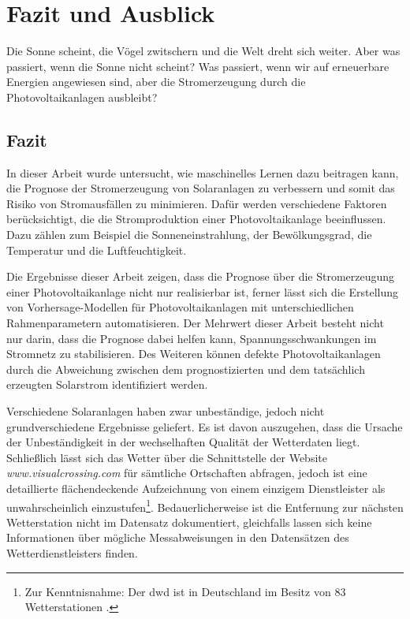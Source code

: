 \documentclass[12pt, a4paper]{article}
\begin{document}

\newpage

\section{Fazit und Ausblick}
\label{sec:conclusion_outlook}

Die Sonne scheint, die Vögel zwitschern und die Welt dreht sich weiter. Aber was passiert, wenn die Sonne nicht scheint? Was passiert, wenn wir auf erneuerbare Energien angewiesen sind, aber die Stromerzeugung durch die Photovoltaikanlagen ausbleibt? 

\subsection{Fazit}

In dieser Arbeit wurde untersucht, wie maschinelles Lernen dazu beitragen kann, die Prognose der Stromerzeugung von Solaranlagen zu verbessern und somit das Risiko von Stromausfällen zu minimieren. Dafür werden verschiedene Faktoren berücksichtigt, die die Stromproduktion einer Photovoltaikanlage beeinflussen. Dazu zählen zum Beispiel die Sonneneinstrahlung, der Bewölkungsgrad, die Temperatur und die Luftfeuchtigkeit.

Die Ergebnisse dieser Arbeit zeigen, dass die Prognose über die Stromerzeugung einer Photovoltaikanlage nicht nur realisierbar ist, ferner lässt sich die Erstellung von Vorhersage-Modellen für Photovoltaikanlagen mit unterschiedlichen Rahmenparametern automatisieren. Der Mehrwert dieser Arbeit besteht nicht nur darin, dass die Prognose dabei helfen kann, Spannungsschwankungen im Stromnetz zu stabilisieren. Des Weiteren können defekte Photovoltaikanlagen durch die Abweichung zwischen dem prognostizierten und dem tatsächlich erzeugten Solarstrom identifiziert werden.

Verschiedene Solaranlagen haben zwar unbeständige, jedoch nicht grundverschiedene Ergebnisse geliefert. Es ist davon auszugehen, dass die Ursache der Unbeständigkeit in der wechselhaften Qualität der Wetterdaten liegt. Schließlich lässt sich das Wetter über die Schnittstelle der Website \textit{www.visualcrossing.com} für sämtliche Ortschaften abfragen, jedoch ist eine detaillierte flächendeckende Aufzeichnung von einem einzigem Dienstleister als unwahrscheinlich einzustufen\footnote{Zur Kenntnisnahme: Der \ac{dwd} ist in Deutschland im Besitz von 83 Wetterstationen \cite{ws:dwdweatherstations}.}. Bedauerlicherweise ist die Entfernung zur nächsten Wetterstation nicht im Datensatz dokumentiert, gleichfalls lassen sich keine Informationen über mögliche Messabweisungen in den Datensätzen des Wetterdienstleisters finden.
\end{document}
